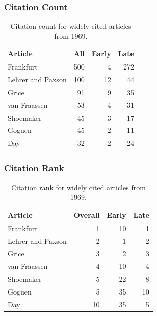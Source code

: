\documentclass[
  10pt,
  letterpaper,
  DIV=11,
  numbers=noendperiod,
  twoside]{scrartcl}
\begin{document}
\subsubsection*{Citation Count}\label{sec-count-1969}

\begin{longtable}[]{@{}lrrr@{}}

\caption{\label{tbl-citation-count-1969}Citation count for widely cited
articles from 1969.}

\tabularnewline

\toprule\noalign{}
Article & All & Early & Late \\
\midrule\noalign{}
\endhead
\bottomrule\noalign{}
\endlastfoot
Frankfurt & 500 & 4 & 272 \\
Lehrer and Paxson & 100 & 12 & 44 \\
Grice & 91 & 9 & 35 \\
van Fraassen & 53 & 4 & 31 \\
Shoemaker & 45 & 3 & 17 \\
Goguen & 45 & 2 & 11 \\
Day & 32 & 2 & 24 \\

\end{longtable}

\subsubsection*{Citation Rank}\label{sec-rank-1969}

\begin{longtable}[]{@{}lrrr@{}}

\caption{\label{tbl-citation-rank-1969}Citation rank for widely cited
articles from 1969.}

\tabularnewline

\toprule\noalign{}
Article & Overall & Early & Late \\
\midrule\noalign{}
\endhead
\bottomrule\noalign{}
\endlastfoot
Frankfurt & 1 & 10 & 1 \\
Lehrer and Paxson & 2 & 1 & 2 \\
Grice & 3 & 2 & 3 \\
van Fraassen & 4 & 10 & 4 \\
Shoemaker & 5 & 22 & 8 \\
Goguen & 5 & 35 & 10 \\
Day & 10 & 35 & 5 \\

\end{longtable}
\end{document}
